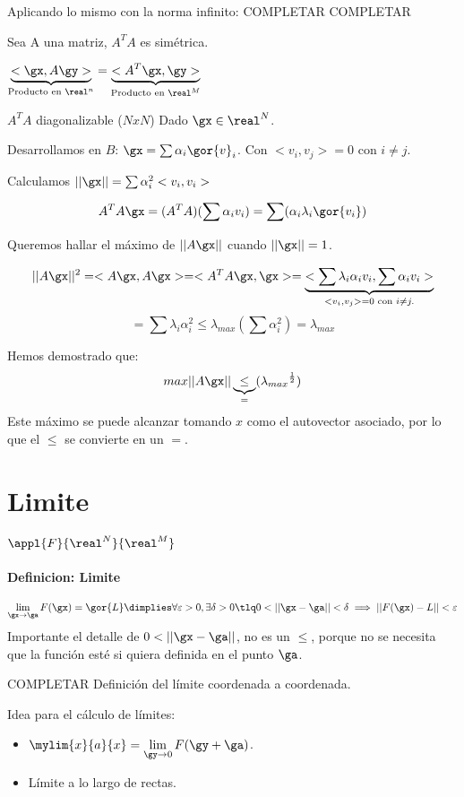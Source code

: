 \documentclass[a4paper,10pt]{apuntes}
\newcommand{\definition}[1]{\paragraph{Definicion: #1\\}}
\begin{document}
Aplicando lo mismo con la norma infinito: COMPLETAR
COMPLETAR

\begin{lemma}
 Sea A una matriz, $A^TA$ es simétrica.
\end{lemma}
\begin{lemma}
 $\underbrace{<\gx,A\gy>}_{\text{Producto en } \real^n} = \underbrace{<A^T\gx,\gy>}_{\text{Producto en } \real^M}$
\end{lemma}

 $A^TA$ diagonalizable ($N x N$)
 Dado $\gx \in \real^N$.

 Desarrollamos en $B$: $\gx = \sum \alpha_i \gor{v}_i$. Con $<v_i,v_j> = 0$ con $i \neq j$.

 Calculamos $||\gx|| = \sum \alpha_i^2<v_i,v_i>$
 
 $$A^TA\gx = (A^TA)(\sum \alpha_i v_i) = \sum (\alpha_i\lambda_i\gor{v_i})$$
 
 Queremos hallar el máximo de $||A\gx||$ cuando $||\gx|| = 1$.
 
 $$||A\gx||^2 = <A\gx,A\gx> = <A^TA\gx,\gx> = \underbrace{<\sum \lambda_i \alpha_i v_i,\sum\alpha_i v_i>}_{<v_i,v_j> =0 \text{ con } i \neq j.}$$
 $$= \sum \lambda_i \alpha_i^2 \leq \lambda_{max} (\sum \alpha_i^2) = \lambda_{max}$$
 
 Hemos demostrado que:
 $$ max||A\gx|| \underbrace{\leq}_{=} ({\lambda_{max}}^{\frac{1}{2}})$$
 Este máximo se puede alcanzar tomando $x$ como el autovector asociado, por lo que el $\leq$ se convierte en un $=$.
 
 \section{Limite}
 $\appl{F}{\real^N}{\real^M}$
 
 \definition{Limite}
 $$\lim_{\gx \rightarrow \ga} F(\gx) = \gor{L} \dimplies \forall \varepsilon > 0,  \exists \delta>0 \tlq 0<||\gx-\ga|| <\delta \implies ||F(\gx) - L||<\varepsilon$$
 Importante el detalle de $0 < ||\gx-\ga||$, no es un $\leq$, porque no se necesita que la función esté si quiera definida en el punto $\ga$.
 \begin{theorem}
  COMPLETAR
  Definición del límite coordenada a coordenada.
 \end{theorem}
 
 Idea para el cálculo de límites: 
 \begin{itemize}
  \item $\displaystyle\mylim{x}{a}{x} = \lim_{\gy\rightarrow 0} F(\gy+\ga)$.
  \item Límite a lo largo de rectas.
 \end{itemize}
\end{document}
